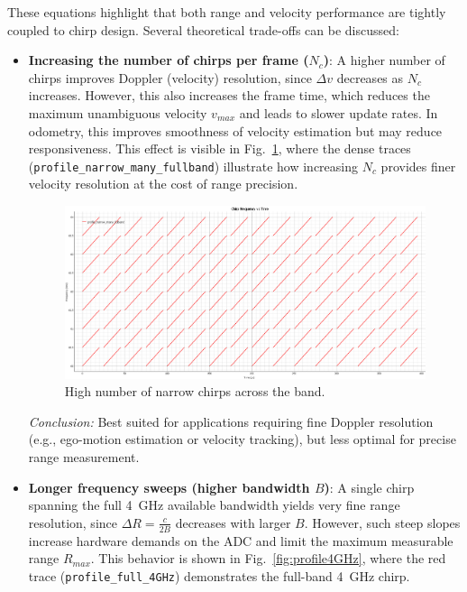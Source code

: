 These equations highlight that both range and velocity performance are tightly coupled to chirp design.  
Several theoretical trade-offs can be discussed:  

\begin{itemize}
    \item \textbf{Increasing the number of chirps per frame ($N_c$)}:  
    A higher number of chirps improves Doppler (velocity) resolution, since $\Delta v$ decreases as $N_c$ increases.  
    However, this also increases the frame time, which reduces the maximum unambiguous velocity $v_{max}$ and leads to slower update rates.  
    In odometry, this improves smoothness of velocity estimation but may reduce responsiveness.  
    This effect is visible in Fig.~\ref{fig:profile_narrow_many_fullband}, where the dense traces (\texttt{profile\_narrow\_many\_fullband}) illustrate how increasing $N_c$ provides finer velocity resolution at the cost of range precision.  

    \begin{figure}[!htbp]
        \centering
        \includegraphics[width=1.0\linewidth]{images/profile_narrow_many_fullband.png}
        \caption{High number of narrow chirps across the band.}
        \label{fig:profile_narrow_many_fullband}
    \end{figure}

    {\small
    \textit{Conclusion:}  
    Best suited for applications requiring fine Doppler resolution (e.g., ego-motion estimation or velocity tracking), but less optimal for precise range measurement.
    }

    \vspace{1em} 
    \item \textbf{Longer frequency sweeps (higher bandwidth $B$)}:  
    A single chirp spanning the full 4~GHz available bandwidth yields very fine range resolution, since $\Delta R = \tfrac{c}{2B}$ decreases with larger $B$.  
    However, such steep slopes increase hardware demands on the ADC and limit the maximum measurable range $R_{max}$.  
    This behavior is shown in Fig.~\ref{fig:profile4GHz}, where the red trace (\texttt{profile\_full\_4GHz}) demonstrates the full-band 4~GHz chirp.  


\end{itemize}
